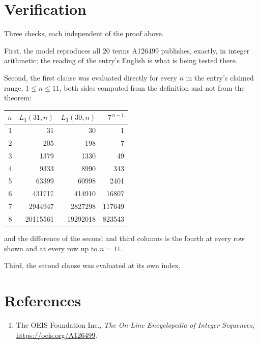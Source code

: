 \documentclass[11pt,a4paper]{article}
\theoremstyle{plain}
\theoremstyle{definition}
\begin{document}
\section{Verification}

Three checks, each independent of the proof above.

First, the model reproduces all $20$ terms A126499 publishes, exactly, in integer
arithmetic; the reading of the entry's English is what is being tested there.

Second, the first clause was evaluated directly for every $n$ in the entry's claimed range,
$1\le n\le11$, both sides computed from the definition and not from the theorem:

\begin{center}
\begin{tabular}{rrrr}
$n$ & $L_{3}(31,n)$ & $L_{3}(30,n)$ & $7^{\,n-1}$ \\ \hline
1 & 31 & 30 & 1 \\
2 & 205 & 198 & 7 \\
3 & 1379 & 1330 & 49 \\
4 & 9333 & 8990 & 343 \\
5 & 63399 & 60998 & 2401 \\
6 & 431717 & 414910 & 16807 \\
7 & 2944947 & 2827298 & 117649 \\
8 & 20115561 & 19292018 & 823543 \\
\end{tabular}
\end{center}

\noindent and the difference of the second and third columns is the fourth at every row shown
and at every row up to $n=11$.

Third, the second clause was evaluated at its own index.

\section*{References}
\begin{enumerate}
\item The OEIS Foundation Inc., \emph{The On-Line Encyclopedia of Integer Sequences},
\url{https://oeis.org/A126499}.
\end{enumerate}
\end{document}

